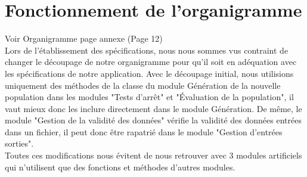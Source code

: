 \documentclass[a4paper,11pt]{article}
\begin{document}
	
	\section{Fonctionnement de l'organigramme}
		Voir Organigramme page annexe (Page 12)\\

		Lors de l'établissement des spécifications, nous nous sommes vus contraint de changer le découpage de notre organigramme pour qu’il soit en adéquation avec les spécifications de notre application. 
		Avec le découpage initial, nous utilisions uniquement des méthodes de la classe du module Génération de la nouvelle population dans les modules "Tests d’arrêt" et "Évaluation de la population", il vaut mieux donc les inclure directement dans le module Génération.
		De même, le module "Gestion de la validité des données" vérifie la validité des données entrées dans un fichier, il peut donc être rapatrié dans le module "Gestion d'entrées sorties". \\
		Toutes ces modifications nous évitent de nous retrouver avec 3 modules artificiels qui n'utilisent que des fonctions et méthodes d'autres modules.

		
		
\end{document}

